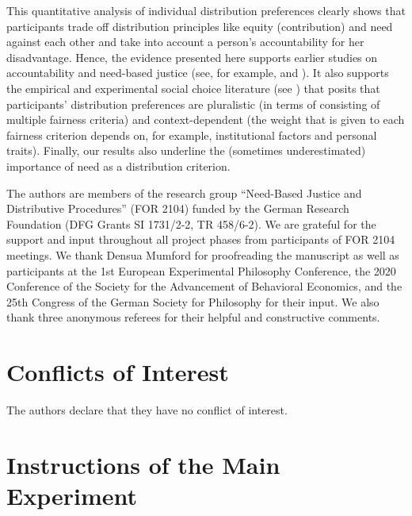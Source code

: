 \documentclass[smallcondensed]{svjour3}
\begin{document}
%
This quantitative analysis of individual distribution preferences clearly shows that participants trade off distribution principles like equity (contribution) and need against each other and take into account a person's accountability for her disadvantage. Hence, the evidence presented here supports earlier studies on accountability and need-based justice (see, for example, \citealt{konow_fair_2001} and \citealt{schwettmann_trading_2009}). It also supports the empirical and experimental social choice literature (see \citealp{konow_economics_2016}) that posits that participants' distribution preferences are pluralistic (in terms of consisting of multiple fairness criteria) and context-dependent (the weight that is given to each fairness criterion depends on, for example, institutional factors and personal traits). Finally, our results also underline the (sometimes underestimated) importance of need as a distribution criterion.\par
%
\begin{acknowledgements}
The authors are members of the research group ``Need-Based Justice and Distributive Procedures'' (FOR 2104) funded by the German Research Foundation (DFG Grants SI 1731/2-2, TR 458/6-2). We are grateful for the support and input throughout all project phases from participants of FOR 2104 meetings. We thank Densua Mumford for proofreading the manuscript as well as participants at the 1st European Experimental Philosophy Conference, the 2020 Conference of the Society for the Advancement of Behavioral Economics, and the 25th Congress of the German Society for Philosophy for their input. We also thank three anonymous referees for their helpful and constructive comments.
\end{acknowledgements}
%
\section*{Conflicts of Interest}
%
The authors declare that they have no conflict of interest.\par
%


%
\clearpage
%
\appendix
\section{Instructions of the Main Experiment}\label{sec:app_instructions}
%
\end{document}
